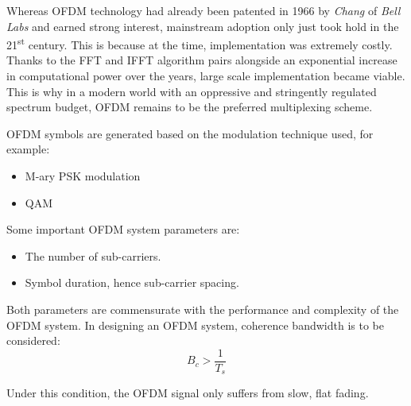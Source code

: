 Whereas \gls{OFDM} technology had already been patented in 1966 by \emph{Chang} of \emph{Bell Labs}\cite{ofdm_intro} and earned strong interest, mainstream adoption only just took hold in the 21\textsuperscript{st} century. This is because at the time, implementation was extremely costly.
Thanks to the \gls{FFT} and \gls{IFFT} algorithm pairs alongside an exponential increase in computational power over the years, large scale implementation became viable. This is why in a modern world with an oppressive and stringently regulated spectrum budget, \gls{OFDM} remains to be the preferred multiplexing scheme.

\gls{OFDM} symbols are generated based on the modulation technique used, for example:
\begin{itemize}
	\item M-ary \gls{PSK} modulation
	\item \gls{QAM}
\end{itemize}
Some important \gls{OFDM} system parameters are:
\begin{itemize}
	\item The number of sub-carriers.
	\item Symbol duration, hence sub-carrier spacing.
\end{itemize}
Both parameters are commensurate with the performance and complexity of the \gls{OFDM} system\cite{wireless_design}. In designing an \gls{OFDM} system, coherence bandwidth is to be considered:
\begin{equation}
	B_c > \frac{1}{T_s}
\end{equation}
\begin{mathDef}
\end{mathDef}
Under this condition, the OFDM signal only suffers from slow, flat fading.
